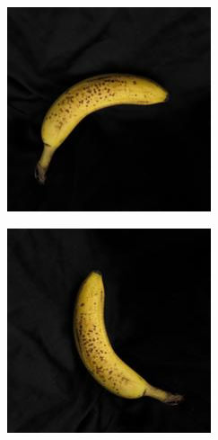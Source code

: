 \documentclass{article} %
\begin{document}
\begin{figure}[h]
\begin{subfigure}{.123\textwidth}
\end{subfigure}%
  \begin{subfigure}{.123\textwidth}
  \centering
\includegraphics[width=\textwidth]{2_3.jpg}
\end{subfigure}%
  \begin{subfigure}{.123\textwidth}
  \centering
\includegraphics[width=\textwidth]{2_4.jpg}

\end{subfigure}
\end{figure}
\end{document}
